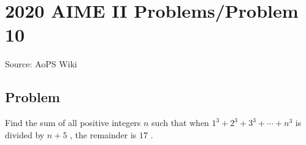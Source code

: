 \documentclass[12pt]{article}
\begin{document}
\section*{{2020 AIME II Problems/Problem 10}}
Source: AoPS Wiki

\subsection*{Problem}
Find the sum of all positive integers $n$ such that when $1^3+2^3+3^3+\cdots +n^3$ is divided by $n+5$ , the remainder is $17$ .
\end{document}
